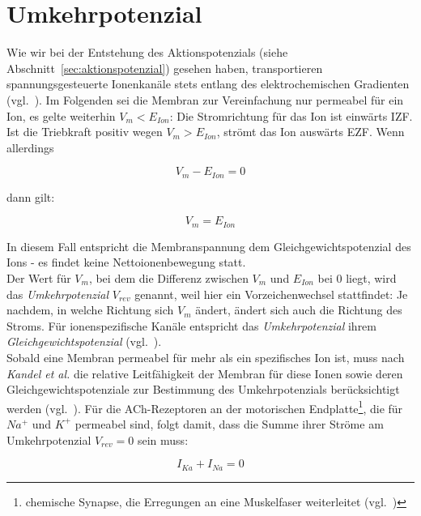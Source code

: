 \section{Umkehrpotenzial}\label{appendix:umkehrpotenzial}
Wie wir bei der Entstehung des Aktionspotenzials (siehe Abschnitt~\ref{sec:aktionspotenzial}) gesehen haben, transportieren spannungsgesteuerte Ionenkanäle stets entlang des elektrochemischen Gradienten (vgl.~\cite[39]{Fak19}).
Im Folgenden sei die Membran zur Vereinfachung nur permeabel für ein Ion, es gelte weiterhin $V_m < E_{Ion}$: Die Stromrichtung für das Ion ist einwärts IZF. Ist die Triebkraft positiv wegen $V_m > E_{Ion}$, strömt das Ion auswärts EZF. Wenn allerdings

\begin{equation}
    V_m - E_{Ion} = 0
\end{equation}

dann gilt:

\begin{equation}
    V_m = E_{Ion}
\end{equation}

In diesem Fall entspricht die Membranspannung dem Gleichgewichtspotenzial des Ions - es findet keine Nettoionenbewegung statt.\\

Der Wert für $V_m$, bei dem die Differenz zwischen $V_m$ und $E_{Ion}$ bei $0$ liegt, wird das \textit{Umkehrpotenzial} $V_{rev}$ genannt, weil hier ein Vorzeichenwechsel stattfindet: Je nachdem, in welche Richtung sich $V_m$ ändert, ändert sich auch die Richtung des Stroms.
Für ionenspezifische Kanäle entspricht das \textit{Umkehrpotenzial} ihrem \textit{Gleichgewichtspotenzial} (vgl.~\cite[95 f.]{SBB+13}).\\

Sobald eine Membran permeabel für mehr als ein spezifisches Ion ist, muss nach \textit{Kandel et al.} die relative Leitfähigkeit der Membran für diese Ionen sowie deren Gleichgewichtspotenziale zur Bestimmung des Umkehrpotenzials berücksichtigt werden (vgl.~\cite[196, Box 9--1]{KSJ+13}).
Für die ACh-Rezeptoren an der motorischen Endplatte\footnote{
    chemische Synapse, die Erregungen an eine Muskelfaser weiterleitet (vgl.~\cite[56]{SD07})
}, die für $Na^+$ und $K^+$ permeabel sind, folgt damit, dass die Summe ihrer Ströme am Umkehrpotenzial $V_{rev} = 0$ sein muss:

\begin{equation}
    I_{Ka} + I_{Na} = 0
\end{equation}

